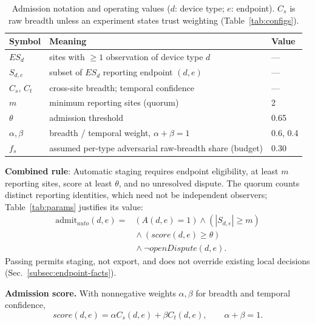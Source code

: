\documentclass[journal]{IEEEtran}
\theoremstyle{definition}
\begin{document}
\begin{table}[t]
\centering
\caption{Admission notation and operating values ($d$: device type; $e$: endpoint). $C_s$ is raw breadth unless an experiment states trust weighting (Table~\ref{tab:configs}).}
\label{tab:symbols}
\scriptsize
\begin{tabular}{@{}p{1.3cm}p{5.00cm}p{0.75cm}@{}}
\toprule
Symbol & Meaning & Value \\
\midrule
$ES_d$ & sites with $\ge1$ observation of device type $d$ & --- \\
$S_{d,e}$ & subset of $ES_d$ reporting endpoint $(d,e)$ & --- \\
$C_s$, $C_t$ & cross-site breadth; temporal confidence & --- \\
$m$ & minimum reporting sites (quorum) & 2 \\
$\theta$ & admission threshold & 0.65 \\
$\alpha,\beta$ & breadth / temporal weight, $\alpha+\beta=1$ & 0.6, 0.4 \\
$f_s$ & assumed per-type adversarial raw-breadth share (budget) & 0.30 \\
\bottomrule
\end{tabular}
\end{table}

\textbf{Combined rule}: Automatic staging requires endpoint eligibility, at least $m$ reporting sites, score at least $\theta$, and no unresolved dispute. The quorum counts distinct reporting identities, which need not be independent observers; Table~\ref{tab:params} justifies its value:
\begin{equation}
\begin{aligned}
\mathrm{admit}_{auto}(d,e)
={}&(A(d,e)=1)\wedge(|S_{d,e}|\ge m)\\
 &{}\wedge(score(d,e)\ge\theta)\\
 &{}\wedge\neg openDispute(d,e).
\end{aligned}
\label{eq:admitauto}
\end{equation}
Passing permits staging, not export, and does not override existing local decisions (Sec.~\ref{subsec:endpoint-facts}).

\textbf{Admission score.} With nonnegative weights $\alpha,\beta$ for breadth and temporal confidence,
\begin{equation}
score(d,e)=\alpha C_s(d,e)+\beta C_t(d,e),
\qquad \alpha+\beta=1 .
\label{eq:score}
\end{equation}

\end{document}
